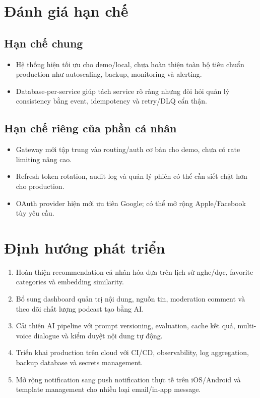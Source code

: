\documentclass[14pt,a4paper,oneside]{extreport}
\begin{document}
\section{Đánh giá hạn chế}
\label{sec:han-che}

\subsection{Hạn chế chung}

\begin{itemize}[leftmargin=2cm]
  \item Hệ thống hiện tối ưu cho demo/local, chưa hoàn thiện toàn bộ tiêu chuẩn production như autoscaling, backup, monitoring và alerting.
  \item Database-per-service giúp tách service rõ ràng nhưng đòi hỏi quản lý consistency bằng event, idempotency và retry/DLQ cẩn thận.
\end{itemize}

\subsection{Hạn chế riêng của phần cá nhân}

\begin{itemize}[leftmargin=2cm]
  \item Gateway mới tập trung vào routing/auth cơ bản cho demo, chưa có rate limiting nâng cao.
  \item Refresh token rotation, audit log và quản lý phiên có thể cần siết chặt hơn cho production.
  \item OAuth provider hiện mới ưu tiên Google; có thể mở rộng Apple/Facebook tùy yêu cầu.
\end{itemize}

\section{Định hướng phát triển}
\label{sec:dinh-huong}

\begin{enumerate}[leftmargin=2cm]
  \item Hoàn thiện recommendation cá nhân hóa dựa trên lịch sử nghe/đọc, favorite categories và embedding similarity.
  \item Bổ sung dashboard quản trị nội dung, nguồn tin, moderation comment và theo dõi chất lượng podcast tạo bằng AI.
  \item Cải thiện AI pipeline với prompt versioning, evaluation, cache kết quả, multi-voice dialogue và kiểm duyệt nội dung tự động.
  \item Triển khai production trên cloud với CI/CD, observability, log aggregation, backup database và secrets management.
  \item Mở rộng notification sang push notification thực tế trên iOS/Android và template management cho nhiều loại email/in-app message.
\end{enumerate}
\end{document}
